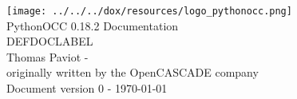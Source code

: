 \documentclass[oneside]{article}
\begin{document}
\hypersetup{pageanchor=false}
\begin{titlepage}
\vspace*{7cm}
\begin{center}%
\texttt{[image: ../../../dox/resources/logo\_pythonocc.png]}\\
\vspace*{1cm}
{\Large PythonOCC 0.18.2 Documentation}\\
{\Large DEFDOCLABEL}\\
\vspace*{1cm}
{\small Thomas Paviot - }\\
{\small originally written by the OpenCASCADE company}\\

\vspace*{1cm}
{\small Document version 0 - \today}\
\end{center}
\end{titlepage}
\clearpage
{}
\tableofcontents
\newpage
{}
\hypersetup{pageanchor=true}

\let\stdsection\section
  \renewcommand\section{\pagebreak\stdsection}
\hypertarget{DEFFILENAME}{}


\newpage
{}
{}
\printindex\n
\end{document}
